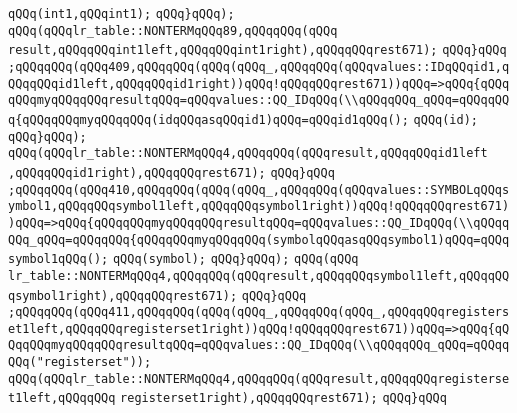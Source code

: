 \verb|qQQq(int1,qQQqint1);|\newline
\verb|qQQq}qQQq);|\newline
\verb|qQQq(qQQqlr_table::NONTERMqQQq89,qQQqqQQq(qQQq|\newline
\verb|result,qQQqqQQqint1left,qQQqqQQqint1right),qQQqqQQqrest671);|\newline
\verb|qQQq}qQQq|\newline
\verb|;qQQqqQQq(qQQq409,qQQqqQQq(qQQq(qQQq_,qQQqqQQq(qQQqvalues::IDqQQqid1,qQQqqQQqid1left,qQQqqQQqid1right))qQQq!qQQqqQQqrest671))qQQq=>qQQq{qQQqqQQqmyqQQqqQQqresultqQQq=qQQqvalues::QQ_IDqQQq(\\qQQqqQQq_qQQq=qQQqqQQq{qQQqqQQqmyqQQqqQQq(idqQQqasqQQqid1)qQQq=qQQqid1qQQq();|\newline
\verb|qQQq(id);|\newline
\verb|qQQq}qQQq);|\newline
\verb|qQQq(qQQqlr_table::NONTERMqQQq4,qQQqqQQq(qQQqresult,qQQqqQQqid1left|\newline
\verb|,qQQqqQQqid1right),qQQqqQQqrest671);|\newline
\verb|qQQq}qQQq|\newline
\verb|;qQQqqQQq(qQQq410,qQQqqQQq(qQQq(qQQq_,qQQqqQQq(qQQqvalues::SYMBOLqQQqsymbol1,qQQqqQQqsymbol1left,qQQqqQQqsymbol1right))qQQq!qQQqqQQqrest671))qQQq=>qQQq{qQQqqQQqmyqQQqqQQqresultqQQq=qQQqvalues::QQ_IDqQQq(\\qQQqqQQq_qQQq=qQQqqQQq{qQQqqQQqmyqQQqqQQq(symbolqQQqasqQQqsymbol1)qQQq=qQQqsymbol1qQQq();|\newline
\verb|qQQq(symbol);|\newline
\verb|qQQq}qQQq);|\newline
\verb|qQQq(qQQq|\newline
\verb|lr_table::NONTERMqQQq4,qQQqqQQq(qQQqresult,qQQqqQQqsymbol1left,qQQqqQQqsymbol1right),qQQqqQQqrest671);|\newline
\verb|qQQq}qQQq|\newline
\verb|;qQQqqQQq(qQQq411,qQQqqQQq(qQQq(qQQq_,qQQqqQQq(qQQq_,qQQqqQQqregisterset1left,qQQqqQQqregisterset1right))qQQq!qQQqqQQqrest671))qQQq=>qQQq{qQQqqQQqmyqQQqqQQqresultqQQq=qQQqvalues::QQ_IDqQQq(\\qQQqqQQq_qQQq=qQQqqQQq("registerset"));|\newline
\verb|qQQq(qQQqlr_table::NONTERMqQQq4,qQQqqQQq(qQQqresult,qQQqqQQqregisterset1left,qQQqqQQq|\newline
\verb|registerset1right),qQQqqQQqrest671);|\newline
\verb|qQQq}qQQq|\newline

